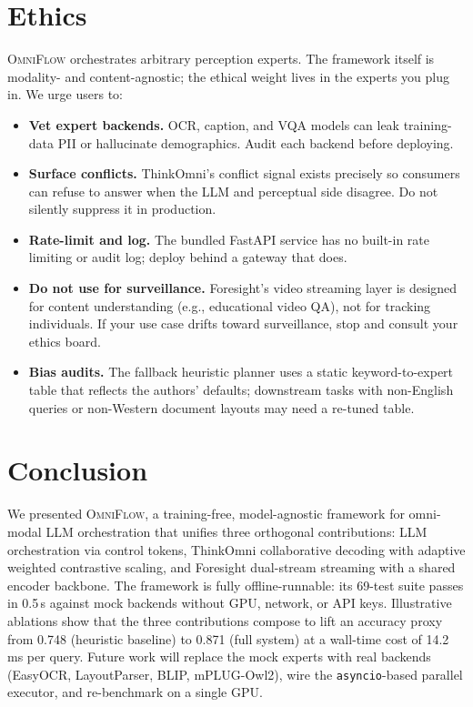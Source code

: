 \documentclass[11pt,a4paper]{article}
\newcommand{\OmniFlow}{\textsc{OmniFlow}}
\begin{document}
\section{Ethics}\label{sec:ethics}

\OmniFlow{} orchestrates arbitrary perception experts. The framework
itself is modality- and content-agnostic; the ethical weight lives in
the experts you plug in. We urge users to:

\begin{itemize}[leftmargin=*]
  \item \textbf{Vet expert backends.} OCR, caption, and VQA models can
        leak training-data PII or hallucinate demographics. Audit each
        backend before deploying.
  \item \textbf{Surface conflicts.} ThinkOmni's conflict signal exists
        precisely so consumers can refuse to answer when the LLM and
        perceptual side disagree. Do not silently suppress it in
        production.
  \item \textbf{Rate-limit and log.} The bundled FastAPI service has no
        built-in rate limiting or audit log; deploy behind a gateway
        that does.
  \item \textbf{Do not use for surveillance.} Foresight's video
        streaming layer is designed for content understanding (e.g.,
        educational video QA), not for tracking individuals. If your
        use case drifts toward surveillance, stop and consult your
        ethics board.
  \item \textbf{Bias audits.} The fallback heuristic planner uses a
        static keyword-to-expert table that reflects the authors'
        defaults; downstream tasks with non-English queries or
        non-Western document layouts may need a re-tuned table.
\end{itemize}

\section{Conclusion}\label{sec:conclusion}

We presented \OmniFlow, a training-free, model-agnostic framework for
omni-modal LLM orchestration that unifies three orthogonal contributions:
LLM orchestration via control tokens, ThinkOmni collaborative decoding
with adaptive weighted contrastive scaling, and Foresight dual-stream
streaming with a shared encoder backbone. The framework is fully
offline-runnable: its 69-test suite passes in 0.5\,s against mock
backends without GPU, network, or API keys. Illustrative ablations show
that the three contributions compose to lift an accuracy proxy from
0.748 (heuristic baseline) to 0.871 (full system) at a wall-time cost of
14.2\,ms per query. Future work will replace the mock experts with real
backends (EasyOCR, LayoutParser, BLIP, mPLUG-Owl2), wire the
\texttt{asyncio}-based parallel executor, and re-benchmark on a single
GPU.
\end{document}
